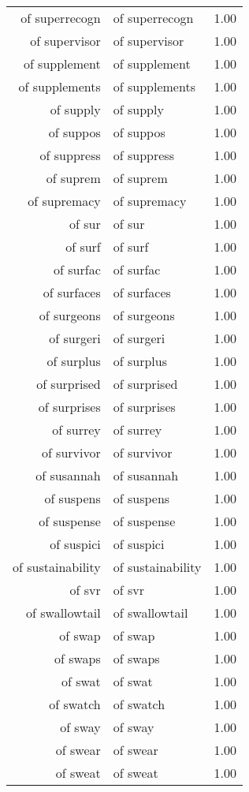 \begin{table}[ht]
\begin{tabular}{rlr}
  of superrecogn & of superrecogn & 1.00 \\ 
  of supervisor & of supervisor & 1.00 \\ 
  of supplement & of supplement & 1.00 \\ 
  of supplements & of supplements & 1.00 \\ 
  of supply & of supply & 1.00 \\ 
  of suppos & of suppos & 1.00 \\ 
  of suppress & of suppress & 1.00 \\ 
  of suprem & of suprem & 1.00 \\ 
  of supremacy & of supremacy & 1.00 \\ 
  of sur & of sur & 1.00 \\ 
  of surf & of surf & 1.00 \\ 
  of surfac & of surfac & 1.00 \\ 
  of surfaces & of surfaces & 1.00 \\ 
  of surgeons & of surgeons & 1.00 \\ 
  of surgeri & of surgeri & 1.00 \\ 
  of surplus & of surplus & 1.00 \\ 
  of surprised & of surprised & 1.00 \\ 
  of surprises & of surprises & 1.00 \\ 
  of surrey & of surrey & 1.00 \\ 
  of survivor & of survivor & 1.00 \\ 
  of susannah & of susannah & 1.00 \\ 
  of suspens & of suspens & 1.00 \\ 
  of suspense & of suspense & 1.00 \\ 
  of suspici & of suspici & 1.00 \\ 
  of sustainability & of sustainability & 1.00 \\ 
  of svr & of svr & 1.00 \\ 
  of swallowtail & of swallowtail & 1.00 \\ 
  of swap & of swap & 1.00 \\ 
  of swaps & of swaps & 1.00 \\ 
  of swat & of swat & 1.00 \\ 
  of swatch & of swatch & 1.00 \\ 
  of sway & of sway & 1.00 \\ 
  of swear & of swear & 1.00 \\ 
  of sweat & of sweat & 1.00 \\ 

\end{tabular}
\end{table}
